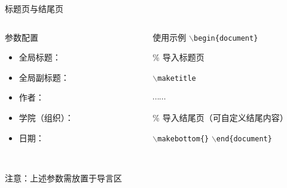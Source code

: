 \documentclass[12pt]{beamer}
\begin{document}
\begin{frame}{标题页与结尾页}
    \begin{columns}[T,onlytextwidth]
        \begin{column}{0.48\textwidth}
            \begin{block}{参数配置}
                \begin{itemize}
                    \item 全局标题：
                    \item 全局副标题：
                    \item 作者：
                    \item 学院（组织）：
                    \item 日期：
                \end{itemize}

                ~\par
                \alert{注意}：上述参数需放置于导言区
            \end{block}
        \end{column}
        
        \begin{column}{0.48\textwidth}
            \begin{block}{使用示例}
                \texttt{$\backslash$begin\{document\}} \par
                \hspace{2em} {\footnotesize \% 导入标题页} \par
                \hspace{2em} \texttt{$\backslash$maketitle} \par
                \hspace{4em} $\cdots \cdots$ \par
                \hspace{2em} {\footnotesize \% 导入结尾页（可自定义结尾内容）} \par
                \hspace{2em} \texttt{$\backslash$makebottom\{\}}
                \texttt{$\backslash$end\{document\}}
            \end{block}
        \end{column}
    \end{columns}
\end{frame}
\end{document}
